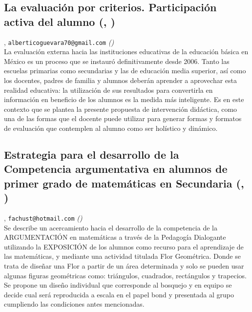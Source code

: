 \subsection{\sffamily La evaluación por criterios. Participación activa del alumno {\footnotesize (, )}} \label{reg-1881} 
, {\tt alberticoguevara70@gmail.com}  {\slshape ()}\\
          \noindent ﻿La evaluación externa hacia las instituciones educativas de la educación básica en México es un proceso que se instauró definitivamente desde 2006. Tanto las escuelas primarias como secundarias y las de educación media superior, así como los docentes, padres de familia y alumnos deberán aprender a aprovechar esta realidad educativa: la utilización de sus resultados para convertirla en información en beneficio de los alumnos es la medida más inteligente. Es en este contexto que se plantea la presente propuesta de intervención didáctica, como una de las formas que el docente puede utilizar para generar formas y formatos de evaluación que contemplen al alumno como ser holístico y dinámico.
\subsection{\sffamily Estrategia para el desarrollo de la Competencia argumentativa en alumnos de primer grado de matemáticas en Secundaria {\footnotesize (, )}} \label{reg-1884} 
, {\tt fachust@hotmail.com}  {\slshape ()}\\
          \noindent Se describe un acercamiento hacia el desarrollo de la competencia de la ARGUMENTACIÓN en matemáticas a través de la Pedagogía Dialogante utilizando la EXPOSICIÓN de los alumnos como recurso para el aprendizaje de las matemáticas, y mediante una actividad titulada Flor Geométrica. Donde se trata de diseñar una Flor a partir de un área determinada y solo se pueden usar algunas figuras geométricas como: triángulos, cuadrados, rectángulos y trapecios. Se propone un diseño individual que corresponde al bosquejo y en equipo se decide cual será reproducida a escala en el papel bond y presentada al grupo cumpliendo las condiciones antes mencionadas.
